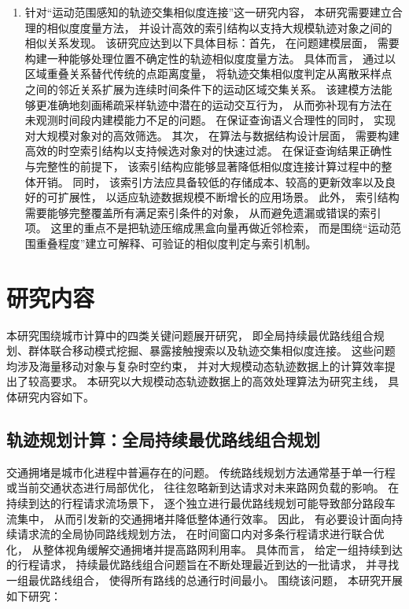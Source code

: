 \begin{enumerate}
    \item 针对“运动范围感知的轨迹交集相似度连接”这一研究内容， 本研究需要建立合理的相似度度量方法， 并设计高效的索引结构以支持大规模轨迹对象之间的相似关系发现。 该研究应达到以下具体目标：首先， 在问题建模层面， 需要构建一种能够处理位置不确定性的轨迹相似度度量方法。 具体而言， 通过以区域重叠关系替代传统的点距离度量， 将轨迹交集相似度判定从离散采样点之间的邻近关系扩展为连续时间条件下的运动区域交集关系。 该建模方法能够更准确地刻画稀疏采样轨迹中潜在的运动交互行为， 从而弥补现有方法在未观测时间段内建模能力不足的问题。 在保证查询语义合理性的同时， 实现对大规模对象对的高效筛选。 其次， 在算法与数据结构设计层面， 需要构建高效的时空索引结构以支持候选对象对的快速过滤。 在保证查询结果正确性与完整性的前提下， 该索引结构应能够显著降低相似度连接计算过程中的整体开销。 同时， 该索引方法应具备较低的存储成本、较高的更新效率以及良好的可扩展性， 以适应轨迹数据规模不断增长的应用场景。 此外， 索引结构需要能够完整覆盖所有满足索引条件的对象， 从而避免遗漏或错误的索引项。 这里的重点不是把轨迹压缩成黑盒向量再做近邻检索， 而是围绕“运动范围重叠程度”建立可解释、可验证的相似度判定与索引机制。

\end{enumerate}

\section{研究内容}
本研究围绕城市计算中的四类关键问题展开研究， 即全局持续最优路线组合规划、群体联合移动模式挖掘、暴露接触搜索以及轨迹交集相似度连接。 这些问题均涉及海量移动对象与复杂时空约束， 并对大规模动态轨迹数据上的计算效率提出了较高要求。 本研究以大规模动态轨迹数据上的高效处理算法为研究主线， 具体研究内容如下。

\subsection{轨迹规划计算：全局持续最优路线组合规划}
交通拥堵是城市化进程中普遍存在的问题。 传统路线规划方法通常基于单一行程或当前交通状态进行局部优化， 往往忽略新到达请求对未来路网负载的影响。 在持续到达的行程请求流场景下， 逐个独立进行最优路线规划可能导致部分路段车流集中， 从而引发新的交通拥堵并降低整体通行效率。 因此， 有必要设计面向持续请求流的全局协同路线规划方法， 在时间窗口内对多条行程请求进行联合优化， 从整体视角缓解交通拥堵并提高路网利用率。 具体而言， 给定一组持续到达的行程请求， 持续最优路线组合问题旨在不断处理最近到达的一批请求， 并寻找一组最优路线组合， 使得所有路线的总通行时间最小。 围绕该问题， 本研究开展如下研究：

